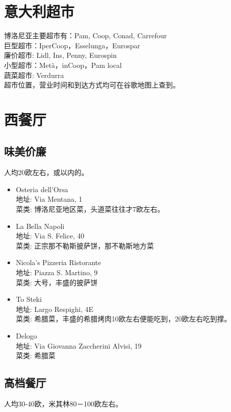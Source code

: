 \begin{multicols}{2}
\section{意大利超市}
\noindent 博洛尼亚主要超市有：Pam, Coop, Conad, Carrefour\\
巨型超市：IperCoop，Esselunga，Eurospar\\
廉价超市: Lidl, Ins, Penny, Eurospin\\
小型超市：Metà，inCoop，Pam local\\
蔬菜超市: Verdurra\\
超市位置，营业时间和到达方式均可在谷歌地图上查到。

\section{西餐厅}

\subsection{味美价廉}
人均20欧左右，或以内的。

\begin{itemize}
\item Osteria dell'Orsa\\
地址: Via Mentana, 1\\
菜类: 博洛尼亚地区菜，头道菜往往才7欧左右。

\item La Bella Napoli\\
地址: Via S. Felice, 40\\
菜类: 正宗那不勒斯披萨饼，那不勒斯地方菜

\item Nicola's Pizzeria Ristorante\\
地址: Piazza S. Martino, 9\\
菜类: 大号，丰盛的披萨饼

\item To Steki\\
地址: Largo Respighi, 4E\\
菜类: 希腊菜，丰盛的希腊烤肉10欧左右便能吃到，20欧左右吃到撑。

\item Delogo\\
地址: Via Giovanna Zaccherini Alvisi, 19\\
菜类: 希腊菜

\end{itemize}

\subsection{高档餐厅}
人均30-40欧，米其林80－100欧左右。


\end{multicols}

